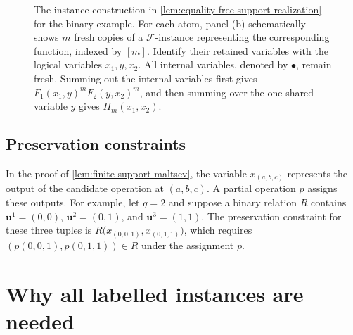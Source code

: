 \documentclass[11pt,letterpaper,onecolumn]{article}
\theoremstyle{plain}
\theoremstyle{definition}
\theoremstyle{remark}
\newcommand{\cF}{\mathcal F}
\begin{document}
\begin{figure}[!t]
{%
  }
  \caption{The instance construction in
  \cref{lem:equality-free-support-realization} for the binary example.
  For each atom, panel (b) schematically shows $m$ fresh copies of a
  $\cF$-instance representing the corresponding function, indexed by $[m]$.
  Identify their retained
  variables with the logical variables $x_1,y,x_2$. All internal
  variables, denoted by $\bullet$, remain fresh.  Summing out the internal
  variables first gives
  $F_1(x_1,y)^mF_2(y,x_2)^m$, and then summing over the one shared variable
  $y$ gives $H_m(x_1,x_2)$.}
  \label{fig:equality-free-support-construction}
\end{figure}


\subsection{Preservation constraints}
\label{app:preservation-constraints-example}

In the proof of \cref{lem:finite-support-maltsev}, the variable
$x_{(a,b,c)}$ represents the output of the candidate operation at
$(a,b,c)$.  A partial operation $p$ assigns these outputs.
For example, let $q=2$ and suppose a binary relation $R$ contains
$\mathbf u^1=(0,0)$, $\mathbf u^2=(0,1)$, and $\mathbf u^3=(1,1)$.
The preservation constraint for these three tuples is $R\bigl(x_{(0,0,1)},x_{(0,1,1)}\bigr)$, which requires
$(p(0,0,1),p(0,1,1))\in R$ under the assignment $p$.

\clearpage
\section{Why all labelled instances are needed}
\label{app:all-instance-isomorphism}
\end{document}

